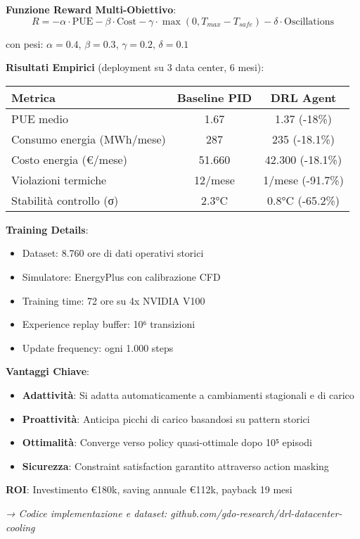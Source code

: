 \begin{tcolorbox}
\vspace{0.3cm}
\textbf{Funzione Reward Multi-Obiettivo}:
\begin{equation*}
R = -\alpha \cdot \text{PUE} - \beta \cdot \text{Cost} - \gamma \cdot \max(0, T_{max} - T_{safe}) - \delta \cdot \text{Oscillations}
\end{equation*}

con pesi: $\alpha=0.4$, $\beta=0.3$, $\gamma=0.2$, $\delta=0.1$

\vspace{0.3cm}
\textbf{Risultati Empirici} (deployment su 3 data center, 6 mesi):

\begin{center}
\begin{tabular}{lcc}
\toprule
\textbf{Metrica} & \textbf{Baseline PID} & \textbf{DRL Agent} \\
\midrule
PUE medio & 1.67 & 1.37 (-18\%) \\
Consumo energia (MWh/mese) & 287 & 235 (-18.1\%) \\
Costo energia (€/mese) & 51.660 & 42.300 (-18.1\%) \\
Violazioni termiche & 12/mese & 1/mese (-91.7\%) \\
Stabilità controllo (σ) & 2.3°C & 0.8°C (-65.2\%) \\
\bottomrule
\end{tabular}
\end{center}

\vspace{0.3cm}
\textbf{Training Details}:
\begin{itemize}
    \item Dataset: 8.760 ore di dati operativi storici
    \item Simulatore: EnergyPlus con calibrazione CFD
    \item Training time: 72 ore su 4x NVIDIA V100
    \item Experience replay buffer: 10⁶ transizioni
    \item Update frequency: ogni 1.000 steps
\end{itemize}

\vspace{0.3cm}
\textbf{Vantaggi Chiave}:
\begin{itemize}
    \item \textbf{Adattività}: Si adatta automaticamente a cambiamenti stagionali e di carico
    \item \textbf{Proattività}: Anticipa picchi di carico basandosi su pattern storici
    \item \textbf{Ottimalità}: Converge verso policy quasi-ottimale dopo 10⁵ episodi
    \item \textbf{Sicurezza}: Constraint satisfaction garantito attraverso action masking
\end{itemize}

\textbf{ROI}: Investimento €180k, saving annuale €112k, payback 19 mesi

\textit{→ Codice implementazione e dataset: github.com/gdo-research/drl-datacenter-cooling}
\end{tcolorbox}

